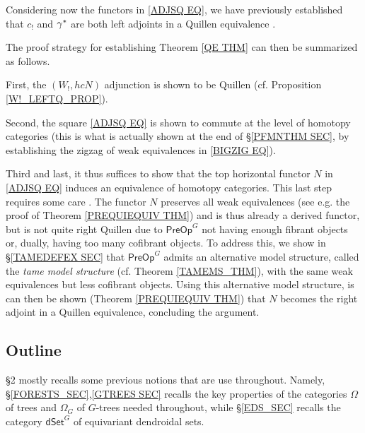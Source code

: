 \documentclass[a4paper,10pt
,draft
]{article}%
\numberwithin{equation}{section}
\numberwithin{figure}{section}
\theoremstyle{definition} %
\newcommand{\1}{\ensuremath{\mathbbm 1}}%
\begin{document}
Considering now the functors in 
\eqref{ADJSQ EQ},
we have previously established that 
$c_!$ and $\gamma^{\**}$
are both left adjoints in a Quillen equivalence
\cite[Thms. 4.30 and 4.41]{BP_edss}.


The proof strategy for establishing 
Theorem \ref{QE THM}
can then be summarized as follows.

First, the $(W_!,hcN)$ adjunction
is shown to be Quillen (cf. Proposition \ref{W!_LEFTQ_PROP}).

Second, the square 
\eqref{ADJSQ EQ}
is shown to commute at the level of homotopy categories 
(this is what is actually shown at the end of 
\S \ref{PFMNTHM SEC}, 
by establishing the zigzag of weak equivalences in 
\eqref{BIGZIG EQ}).

Third and last, it thus suffices to show that the top horizontal 
functor $N$ in \eqref{ADJSQ EQ}
induces an equivalence of homotopy categories.
This last step requires some care . 
The functor $N$ preserves all weak equivalences
(see e.g. the proof of Theorem \ref{PREQUIEQUIV THM})
and is thus already a derived functor,
but is not quite right Quillen 
due to $\mathsf{PreOp}^G$ not having enough fibrant objects 
or, dually, having too many cofibrant objects.
To address this, we show in \S \ref{TAMEDEFEX SEC}
that $\mathsf{PreOp}^G$
admits an alternative model structure, 
called the \emph{tame model structure} 
(cf. Theorem \ref{TAMEMS_THM}),
with the same weak equivalences but
less cofibrant objects.
Using this alternative model structure,
is can then be shown 
(Theorem \ref{PREQUIEQUIV THM})
that $N$ becomes the right adjoint in a Quillen equivalence,
concluding the argument.








\subsection{Outline}


\S 2 mostly recalls 
some previous notions that are use throughout.
Namely, 
\S \ref{FORESTS_SEC},\ref{GTREES SEC}
recalls the key properties of the categories 
$\Omega$ of trees and 
$\Omega_G$ of $G$-trees needed throughout,
while 
\S \ref{EDS_SEC}
recalls the category 
$\mathsf{dSet}^G$
of equivariant dendroidal sets.
\end{document}
